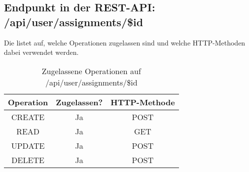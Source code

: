 \subsection{Endpunkt in der REST-API: /api/user/assignments/\$id}
Die  listet auf, welche Operationen zugelassen sind und welche HTTP-Methoden dabei verwendet werden. 

\begin{table}[!htbp]
	\begin{tabular}{|c|c|c|}
		\hline
			\textbf{Operation} & \textbf{Zugelassen?} & \textbf{HTTP-Methode} \\ \hline
			CREATE & Ja & POST \\ \hline 
			READ & Ja & GET \\ \hline
			UPDATE & Ja & POST \\ \hline 
			DELETE & Ja & POST \\ \hline
	\end{tabular}

		\caption{Zugelassene Operationen auf /api/user/assignments/\$id}
		\label{tab:end:rest:api:user:assignments:id:meth}
\end{table}

